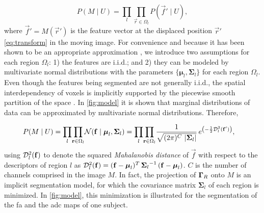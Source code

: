   \begin{equation}
  P(M \mid U) = \underset{l}{\prod} \underset{\vec{r}\in \Omega_l}{\prod}
    P\left( \vec{f}' \mid U \right),
  \label{eq:bayes_aposteriori}
  \end{equation}
  where $\vec{f}' = M(\vec{r}')$ is the feature vector at the displaced
  position $\vec{r}'$ \eqref{eq:transform} in the moving image.
For convenience and because it has been shown to be an appropriate approximation
  \citep{leemput_automated_1999,cuadra_comparison_2005}, we introduce two assumptions for each
  region $\Omega_l$:
  1) the features are i.i.d.; and 2) they can be modeled by multivariate normal
  distributions with the parameters $\lbrace \boldsymbol{\mu}_l, \boldsymbol{\Sigma}_{l} \rbrace$
  for each region $\Omega_l$.
Even though the features being segmented are not generally i.i.d., the spatial interdependency of
  voxels is implicitly supported by the piecewise smooth partition of the space \omegaset{}.
In \autoref{fig:model} it is shown that marginal distributions of data can be approximated by
  multivariate normal distributions. Therefore,

  \begin{align}
  P( M \mid U) &= \underset{l}{\prod} \underset{\vec{r} \in \Omega_l}{\prod}
  \mathcal{N} ( \vec{f} \mid \boldsymbol{\mu}_l, \boldsymbol{\Sigma}_{l} ) =   \underset{l}{\prod} \underset{\vec{r} \in \Omega_l}{\prod} \frac{1}{ \sqrt{(2\pi)^{C}\,\left|\boldsymbol{\Sigma}_{l}\right|}}\,{e^{\left(-\frac{1}{2}
  \mdist{f'}{l} \right)}},
  \label{eq:pdf}
  \end{align}
  using $\mdist{f}{l}$ to denote the squared \emph{Mahalanobis distance} of $\vec{f}$ with respect
  to the descriptors of region $l$ as
  $\mdist{f}{l} = (\vec{f} - \boldsymbol{\mu}_l)^T \, {\boldsymbol{\Sigma}_l}^{-1} \, (\vec{f} - \boldsymbol{\mu}_l)$.
$C$ is the number of channels comprised in the image $M$.
In fact, the projection of $\gammaset_R$ onto $M$ is an implicit segmentation model, for which
  the covariance matrix $\boldsymbol{\Sigma}_l$ of each region is minimized. In \autoref{fig:model},
  this minimization is illustrated for the segmentation of the \gls*{fa} and the \gls*{adc} maps
  of one subject.

